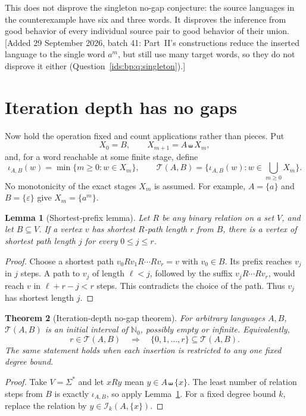 \documentclass[11pt,letterpaper]{article}
\newtheorem{theorem}{Theorem}[section]
\newtheorem{lemma}[theorem]{Lemma}
\theoremstyle{definition}\newtheorem{definition}[theorem]{Definition}
\theoremstyle{remark}\newtheorem{remark}[theorem]{Remark}
\theoremstyle{definition}\newtheorem{question}[theorem]{Question}
\newcommand{\Nzero}{\mathbb N_0}
\newcommand{\eps}{\varepsilon}
\newcommand{\sh}{\mathbin{\shuffle}}
\newcommand{\ins}[3]{\mathcal I_{#1}(#2,#3)}
\begin{document}
This does not disprove the singleton no-gap conjecture: the source languages in the counterexample have six and three words. It disproves the inference from good behavior of every individual source pair to good behavior of their union.
[Added 29 September 2026, batch 41: Part~II's constructions reduce the inserted language to the single word $a^m$, but still use many target words, so they do not disprove it either (Question~\ref{ids:bp:q:singleton}).]

\section{Iteration depth has no gaps}\label{sec:depth}

Now hold the operation fixed and count applications rather than pieces. Put
\[
 X_0=B,\qquad X_{m+1}=A\sh X_m,
\]
and, for a word reachable at some finite stage, define
\[
 \iota_{A,B}(w)=\min\{m\geq0:w\in X_m\},\qquad
 \mathcal T(A,B)=\{\iota_{A,B}(w):w\in\bigcup_{m\geq0}X_m\}.
\]
No monotonicity of the exact stages $X_m$ is assumed. For example, $A=\{a\}$ and $B=\{\eps\}$ give $X_m=\{a^m\}$.

\begin{lemma}[Shortest-prefix lemma]\label{lem:prefix}
Let $R$ be any binary relation on a set $V$, and let $B\subseteq V$. If a vertex $v$ has shortest $R$-path length $r$ from $B$, there is a vertex of shortest path length $j$ for every $0\leq j\leq r$.
\end{lemma}
\begin{proof}
Choose a shortest path $v_0Rv_1R\cdots Rv_r=v$ with $v_0\in B$. Its prefix reaches $v_j$ in $j$ steps. A path to $v_j$ of length $\ell<j$, followed by the suffix $v_jR\cdots Rv_r$, would reach $v$ in $\ell+r-j<r$ steps. This contradicts the choice of the path. Thus $v_j$ has shortest length $j$.
\end{proof}

\begin{theorem}[Iteration-depth no-gap theorem]\label{thm:depth}
For arbitrary languages $A,B$, $\mathcal T(A,B)$ is an initial interval of $\Nzero$, possibly empty or infinite. Equivalently,
\[
 r\in\mathcal T(A,B)\quad\Longrightarrow\quad
 \{0,1,\ldots,r\}\subseteq\mathcal T(A,B).
\]
The same statement holds when each insertion is restricted to any one fixed degree bound.
\end{theorem}
\begin{proof}
Take $V=\Sigma^*$ and let $xRy$ mean $y\in A\sh\{x\}$. The least number of relation steps from $B$ is exactly $\iota_{A,B}$, so apply Lemma~\ref{lem:prefix}. For a fixed degree bound $k$, replace the relation by $y\in\ins{k}{A}{\{x\}}$.
\end{proof}
\end{document}
